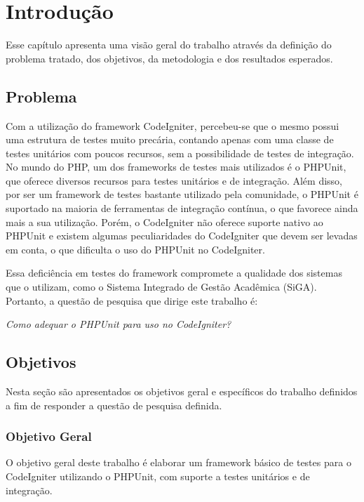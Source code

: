 \chapter[Introdução]{Introdução}

Esse capítulo apresenta uma visão geral do trabalho através da definição do problema tratado, dos objetivos, 
da metodologia e dos resultados esperados.

\section{Problema}

Com a utilização do framework CodeIgniter, percebeu-se que o mesmo possui uma estrutura de testes muito precária, contando
apenas com uma classe de testes unitários com poucos recursos, sem a possibilidade de testes de integração. No mundo do PHP,
um dos frameworks de testes mais utilizados é o PHPUnit, que oferece diversos recursos para testes unitários e de integração.
Além disso, por ser um framework de testes bastante utilizado pela comunidade, o PHPUnit é suportado na maioria de ferramentas
de integração contínua, o que favorece ainda mais a sua utilização. Porém, o CodeIgniter não oferece suporte nativo ao PHPUnit
e existem algumas peculiaridades do CodeIgniter que devem ser levadas em conta, o que dificulta o uso do PHPUnit no CodeIgniter.

Essa deficiência em testes do framework compromete a qualidade dos sistemas que o utilizam,
como o Sistema Integrado de Gestão Acadêmica (SiGA). Portanto, a questão de pesquisa que dirige este trabalho é:

\textit{Como adequar o PHPUnit para uso no CodeIgniter?}
  
\section{Objetivos}

  Nesta seção são apresentados os objetivos geral e específicos do trabalho definidos a fim de responder a
  questão de pesquisa definida.

\subsection{Objetivo Geral}

O objetivo geral deste trabalho é elaborar um framework básico de testes para o CodeIgniter utilizando o PHPUnit, com suporte a 
testes unitários e de integração.

